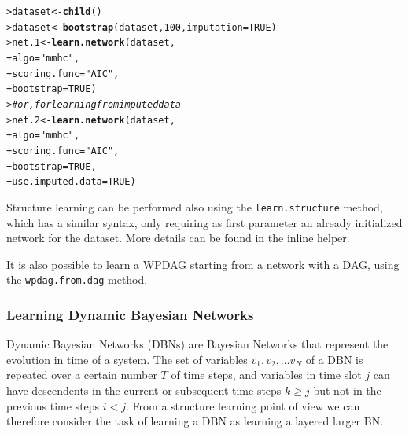 \documentclass{article}\usepackage[]{graphicx}\usepackage[]{color}
\makeatletter
\newcommand{\hlnum}[1]{\textcolor[rgb]{0.686,0.059,0.569}{#1}}%
\newcommand{\hlstr}[1]{\textcolor[rgb]{0.192,0.494,0.8}{#1}}%
\newcommand{\hlcom}[1]{\textcolor[rgb]{0.678,0.584,0.686}{\textit{#1}}}%
\newcommand{\hlstd}[1]{\textcolor[rgb]{0.345,0.345,0.345}{#1}}%
\newcommand{\hlkwb}[1]{\textcolor[rgb]{0.69,0.353,0.396}{#1}}%
\newcommand{\hlkwc}[1]{\textcolor[rgb]{0.333,0.667,0.333}{#1}}%
\newcommand{\hlkwd}[1]{\textcolor[rgb]{0.737,0.353,0.396}{\textbf{#1}}}%
\newenvironment{kframe}{%
 \def\at@end@of@kframe{}%
 \ifinner\ifhmode%
  \def\at@end@of@kframe{\end{minipage}}%
  \begin{minipage}{\columnwidth}%
 \fi\fi%
 \def\FrameCommand##1{\hskip\@totalleftmargin \hskip-\fboxsep
 \colorbox{shadecolor}{##1}\hskip-\fboxsep
     \hskip-\linewidth \hskip-\@totalleftmargin \hskip\columnwidth}%
 \MakeFramed {\advance\hsize-\width
   \@totalleftmargin\z@ \linewidth\hsize
   \@setminipage}}%
 {\par\unskip\endMakeFramed%
 \at@end@of@kframe}
\newenvironment{knitrout}{}{} %
\newcommand{\Rmethod}[1]{{\texttt{#1}}}
\makeatother
\begin{document}
\begin{knitrout}
\color{fgcolor}\begin{kframe}
\begin{alltt}
\hlstd{> }\hlstd{dataset} \hlkwb{<-} \hlkwd{child}\hlstd{()}
\hlstd{> }\hlstd{dataset} \hlkwb{<-} \hlkwd{bootstrap}\hlstd{(dataset,} \hlnum{100}\hlstd{,} \hlkwc{imputation} \hlstd{=} \hlnum{TRUE}\hlstd{)}
\hlstd{> }\hlstd{net.1}   \hlkwb{<-} \hlkwd{learn.network}\hlstd{(dataset,}
\hlstd{+ }                         \hlkwc{algo} \hlstd{=} \hlstr{"mmhc"}\hlstd{,}
\hlstd{+ }                         \hlkwc{scoring.func} \hlstd{=} \hlstr{"AIC"}\hlstd{,}
\hlstd{+ }                         \hlkwc{bootstrap} \hlstd{=} \hlnum{TRUE}\hlstd{)}
\hlstd{> }\hlcom{# or, for learning from imputed data}
\hlstd{> }\hlstd{net.2}   \hlkwb{<-} \hlkwd{learn.network}\hlstd{(dataset,}
\hlstd{+ }                         \hlkwc{algo} \hlstd{=} \hlstr{"mmhc"}\hlstd{,}
\hlstd{+ }                         \hlkwc{scoring.func} \hlstd{=} \hlstr{"AIC"}\hlstd{,}
\hlstd{+ }                         \hlkwc{bootstrap} \hlstd{=} \hlnum{TRUE}\hlstd{,}
\hlstd{+ }                         \hlkwc{use.imputed.data} \hlstd{=} \hlnum{TRUE}\hlstd{)}
\end{alltt}
\end{kframe}
\end{knitrout}

Structure learning can be performed also using the \Rmethod{learn.structure} method, which has a similar syntax, only requiring as
first parameter an already initialized network for the dataset. More details can be found in the inline helper.

It is also possible to learn a WPDAG starting from a network with a DAG, using the \Rmethod{wpdag.from.dag} method.

\subsubsection{Learning Dynamic Bayesian Networks}\label{sec:dbns}
Dynamic Bayesian Networks (DBNs) are Bayesian Networks that represent the evolution in time of a system.
The set of variables $v_1, v_2, \dots v_N$ of a DBN is repeated over a certain number $T$ of time steps,
and variables in time slot $j$ can have descendents in the current or subsequent time steps $k\geq j$ but
not in the previous time
steps $i<j$. From a structure learning point of view we can therefore consider the task of learning a DBN
as learning a layered larger BN.
\end{document}

